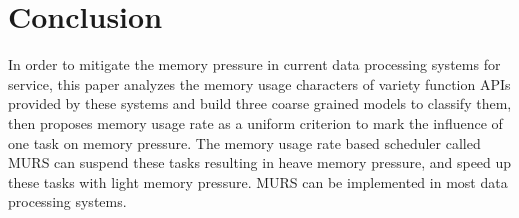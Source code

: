 \section{Conclusion}

In order to mitigate the memory pressure in current data processing systems for service, this paper analyzes the memory usage characters of variety function APIs provided by these systems and build three coarse grained models to classify them, then proposes memory usage rate as a uniform criterion to mark the influence of one task on memory pressure. The memory usage rate based scheduler called MURS can suspend these tasks resulting in heave memory pressure, and speed up these tasks with light memory pressure. MURS can be implemented in most data processing systems.
